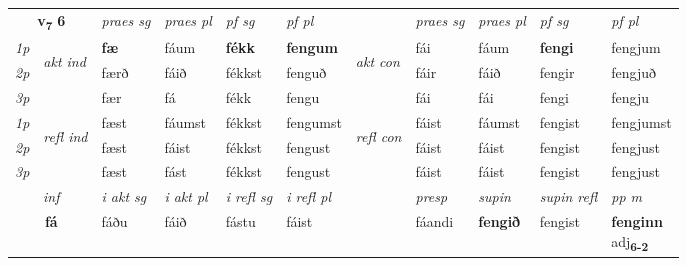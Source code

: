 \noindent
\begin{tabular}{lllllllllll} \toprule
\multicolumn{2}{c}{\textbf{v{\textsubscript{7}}} \Large{\textbf{6}}}  &  \textit{praes sg}  & \textit{praes pl}  &\textit{ pf sg} & \textit{pf pl} &  &  \textit{praes sg}  & \textit{praes pl}  & \textit{pf sg} & \textit{pf pl } \\*
	\cmidrule{3-6} \cmidrule{8-11}
 {\textit{1p}} & \multirow{3}{*}{\begin{turn}{90}\textit{akt ind}\end{turn}} & \textbf{fæ} & fáum & \textbf{fékk} & \textbf{fengum} & \multirow{3}{*}{\begin{turn}{90}\textit{akt con}\end{turn}} &fái & fáum & \textbf{fengi} & fengjum\\*
 {\textit{2p}} &  &  færð  & fáið & fékkst & fenguð & & fáir & fáið & fengir & fengjuð \\*
{\textit{3p}} &  & fær & fá & fékk & fengu & & fái & fái& fengi & fengju \\*
\cmidrule{3-6} \cmidrule{8-11}
 {\textit{1p}} & \multirow{3}{*}{\begin{turn}{90}\textit{refl ind}\end{turn}}  & fæst & fáumst & fékkst & fengumst & \multirow{3}{*}{\begin{turn}{90}\textit{refl con}\end{turn}}  &fáist & fáumst & fengist & fengjumst \\*
 {\textit{2p}} &  & fæst & fáist & fékkst & fengust & &fáist & fáist & fengist & fengjust \\*
 {\textit{3p}}  & & fæst & fást & fékkst & fengust & & fáist & fáist& fengist & fengjust \\*
\cmidrule{3-6} \cmidrule{8-11}

   \multicolumn{2}{c}{\textit{inf}}  & \textit{i akt sg} & \textit{i akt pl} & \textit{i refl sg} & \textit{i refl pl} && \textit{presp} & \textit{supin} & \textit{supin refl} & \textit{pp m} \\*
  \multicolumn{2}{c}{\textbf{fá}} & fáðu  & fáið & fástu & fáist && fáandi &  \textbf{fengið} & fengist & \specialcell{\textbf{fenginn} \\ adj\textbf{\textsubscript{6-2}}} \\*
\end{tabular}

